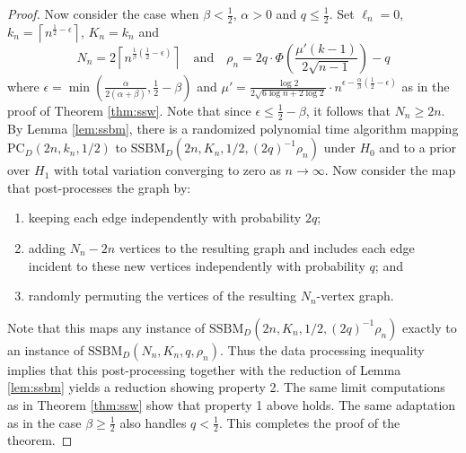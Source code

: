 \begin{proof}
Now consider the case when $\beta < \frac{1}{2}$, $\alpha > 0$ and $q \le \frac{1}{2}$. Set $\ell_n = 0$, $k_n = \left\lceil n^{\frac{1}{2} - \epsilon} \right\rceil$, $K_n = k_n$ and
$$N_n = 2\left\lceil n^{\frac{1}{\beta} \left( \frac{1}{2} - \epsilon \right)}\right\rceil \quad \text{and} \quad \rho_n = 2q \cdot \Phi\left( \frac{\mu'(k - 1)}{2\sqrt{n- 1}} \right) - q$$
where $\epsilon = \min \left( \frac{\alpha}{2(\alpha + \beta)}, \frac{1}{2} - \beta \right)$ and $\mu' = \frac{\log 2}{2 \sqrt{6 \log n + 2\log 2}} \cdot n^{\epsilon - \frac{\alpha}{\beta} \left( \frac{1}{2} - \epsilon \right)}$ as in the proof of Theorem \ref{thm:ssw}. Note that since $\epsilon \le \frac{1}{2} - \beta$, it follows that $N_n \ge 2n$. By Lemma \ref{lem:ssbm}, there is a randomized polynomial time algorithm mapping $\text{PC}_D(2n, k_n, 1/2)$ to $\text{SSBM}_D(2n, K_n, 1/2, (2q)^{-1} \rho_n)$ under $H_0$ and to a prior over $H_1$ with total variation converging to zero as $n \to \infty$. Now consider the map that post-processes the graph by:
\begin{enumerate}
\item keeping each edge independently with probability $2q$;
\item adding $N_n - 2n$ vertices to the resulting graph and includes each edge incident to these new vertices independently with probability $q$; and
\item randomly permuting the vertices of the resulting $N_n$-vertex graph.
\end{enumerate}
Note that this maps any instance of $\text{SSBM}_D(2n, K_n, 1/2, (2q)^{-1} \rho_n)$ exactly to an instance of $\text{SSBM}_D(N_n, K_n, q, \rho_n)$. Thus the data processing inequality implies that this post-processing together with the reduction of Lemma \ref{lem:ssbm} yields a reduction showing property 2. The same limit computations as in Theorem \ref{thm:ssw} show that property 1 above holds. The same adaptation as in the case $\beta \ge \frac{1}{2}$ also handles $q < \frac{1}{2}$. This completes the proof of the theorem.
\end{proof}